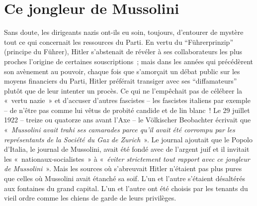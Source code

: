 \documentclass[french,twoside]{book} %
\begin{document}
\section[{Ce jongleur de Mussolini}]{Ce jongleur de Mussolini}
\noindent Sans doute, les dirigeants nazis ont-ils eu soin, toujours, d’entourer de mystère tout ce qui concernait les ressources du Parti. En vertu du “Führerprinzip” (principe du Führer), Hitler s’abstenait de révéler à ses collaborateurs les plus proches l’origine de certaines souscriptions ; mais dans les années qui précédèrent son avènement au pouvoir, chaque fois que s’amorçait un débat public sur les moyens financiers du Parti, Hitler préférait transiger avec ses “diffamateurs” plutôt que de leur intenter un procès. Ce qui ne l’empêchait pas de célébrer la « vertu nazie » et d’accuser d’autres fascistes – les fascistes italiens par exemple – de n’être pas comme lui vêtus de probité candide et de lin blanc ! Le 29 juillet 1922 – treize ou quatorze ans avant l’Axe – le Völkischer Beobachter écrivait que « \emph{Mussolini avait trahi ses camarades parce qu’il avait été corrompu par les représentants de la Société du Gaz de Zurich} ». Le journal ajoutait que le Popolo d’Italia, le journal de Mussolini, avait été fondé avec de l’argent juif et il invitait les « nationaux-socialistes » à « \emph{éviter strictement tout rapport avec ce jongleur de Mussolini} ». Mais les sources où s’abreuvait Hitler n’étaient pas plus pures que celles où Mussolini avait étanché sa soif. L’un et l’autre s’étaient désaltérés aux fontaines du grand capital. L’un et l’autre ont été choisis par les tenants du vieil ordre comme les chiens de garde de leurs privilèges.
\end{document}
